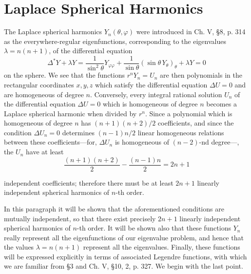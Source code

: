 \section{Laplace Spherical Harmonics}
The Laplace spherical harmonics $Y_n(\theta,\varphi)$ were introduced in Ch. V, \S8, p. 314 as the everywhere-regular eigenfunctions, corresponding to the eigenvalues $\lambda=n(n+1)$, of the differential equation
\begin{equation}\tag{73}
\Delta^*Y+\lambda Y
=\frac{1}{\sin^2\theta}Y_{\varphi\varphi}
+\frac{1}{\sin\theta}(\sin\theta\,Y_\theta)_\theta
+\lambda Y=0
\end{equation}
on the sphere. We see that the functions $r^nY_n=U_n$ are then polynomials in the rectangular coordinates $x,y,z$ which satisfy the differential equation $\Delta U=0$ and are homogeneous of degree $n$. Conversely, every integral rational solution $U_n$ of the differential equation $\Delta U=0$ which is homogeneous of degree $n$ becomes a Laplace spherical harmonic when divided by $r^n$. Since a polynomial which is homogeneous of degree $n$ has $(n+1)(n+2)/2$ coefficients, and since the condition $\Delta U_n=0$ determines $(n-1)n/2$ linear homogeneous relations between these coefficients---for, $\Delta U_n$ is homogeneous of $(n-2)$-nd degree---, the $U_n$ have at least
\[
\frac{(n+1)(n+2)}{2}-\frac{(n-1)n}{2}=2n+1
\]

independent coefficients; therefore there must be at least $2n+1$ linearly independent spherical harmonics of $n$-th order.

In this paragraph it will be shown that the aforementioned conditions are mutually independent, so that there exist precisely $2n+1$ linearly independent spherical harmonics of $n$-th order. It will be shown also that these functions $Y_n$ really represent all the eigenfunctions of our eigenvalue problem, and hence that the values $\lambda=n(n+1)$ represent all the eigenvalues. Finally, these functions will be expressed explicitly in terms of associated Legendre functions, with which we are familiar from \S3 and Ch. V, \S10, 2, p. 327. We begin with the last point.

